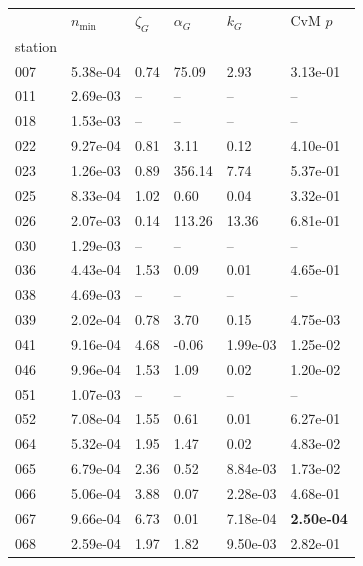 \begin{figure}[htbp!]
    \centering
    {\footnotesize
    \begin{minipage}[t]{0.48\linewidth}
        \centering
        \begin{tabular}{llllll}
        \toprule
         & $n_{\min}$ & $\zeta_G$ & $\alpha_G$ & $k_G$ & CvM $p$ \\
        station &  &  &  &  &  \\
        \midrule
                    007 & 5.38e-04 & 0.74 & 75.09 & 2.93 & 3.13e-01\\
                    011 & 2.69e-03 & -- & -- & -- & --\\
                    018 & 1.53e-03 & -- & -- & -- & --\\
                    022 & 9.27e-04 & 0.81 & 3.11 & 0.12 & 4.10e-01\\
                    023 & 1.26e-03 & 0.89 & 356.14 & 7.74 & 5.37e-01\\
                    025 & 8.33e-04 & 1.02 & 0.60 & 0.04 & 3.32e-01\\
                    026 & 2.07e-03 & 0.14 & 113.26 & 13.36 & 6.81e-01\\
                    030 & 1.29e-03 & -- & -- & -- & --\\
                    036 & 4.43e-04 & 1.53 & 0.09 & 0.01 & 4.65e-01\\
                    038 & 4.69e-03 & -- & -- & -- & --\\
                    039 & 2.02e-04 & 0.78 & 3.70 & 0.15 & 4.75e-03\\
                    041 & 9.16e-04 & 4.68 & -0.06 & 1.99e-03 & 1.25e-02\\
                    046 & 9.96e-04 & 1.53 & 1.09 & 0.02 & 1.20e-02\\
                    051 & 1.07e-03 & -- & -- & -- & --\\
                    052 & 7.08e-04 & 1.55 & 0.61 & 0.01 & 6.27e-01\\
                    064 & 5.32e-04 & 1.95 & 1.47 & 0.02 & 4.83e-02\\
                    065 & 6.79e-04 & 2.36 & 0.52 & 8.84e-03 & 1.73e-02\\
                    066 & 5.06e-04 & 3.88 & 0.07 & 2.28e-03 & 4.68e-01\\
                    067 & 9.66e-04 & 6.73 & 0.01 & 7.18e-04 & \textbf{2.50e-04}\\
                    068 & 2.59e-04 & 1.97 & 1.82 & 9.50e-03 & 2.82e-01\\

\end{tabular}
\end{minipage}}
\end{figure}
